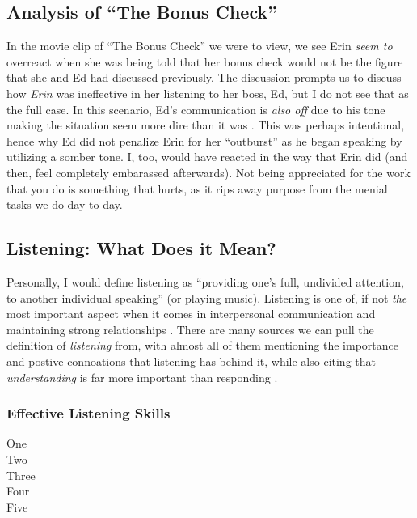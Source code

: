 \documentclass[stu,12pt]{apa7}
\begin{document}
    \newpage
    \subsection{Analysis of ``The Bonus Check''}
      In the movie clip of ``The Bonus Check'' we were to view, we see Erin
        \textit{seem to} overreact when she was being told that her bonus check
        would not be the figure that she and Ed had discussed previously. The
        discussion prompts us to discuss how \textit{Erin} was ineffective in
        her listening to her boss, Ed, but I do not see that as the full case.
        In this scenario, Ed's communication is \textit{also off} due to his
        tone making the situation seem more dire than it was
        \parencite{soderbergh_erin_2000}. This was perhaps intentional, hence
        why Ed did not penalize Erin for her ``outburst'' as he began speaking
        by utilizing a somber tone. I, too, would have reacted in the way that
        Erin did (and then, feel completely embarassed afterwards). Not being
        appreciated for the work that you do is something that hurts, as it rips
        away purpose from the menial tasks we do day-to-day.


    \subsection{Listening: What Does it Mean?}
      Personally, I would define listening as ``providing one's full, undivided
        attention, to another individual speaking'' (or playing music).
        Listening is one of, if not \textit{the} most important aspect when it
        comes in interpersonal communication and maintaining strong
        relationships \parencite{bodie_listening_2012}. There are many sources
        we can pull the definition of \textit{listening} from, with almost all
        of them mentioning the importance and postive connoations that listening
        has behind it, while also citing that \textit{understanding} is far more
        important than responding \parencite[pp. 116]{bodie_listening_2012}.

      \subsubsection{Effective Listening Skills}
          \begin{description}
            \item[One]
            \item[Two]
            \item[Three]
            \item[Four]
            \item[Five]
          \end{description}
\end{document}
